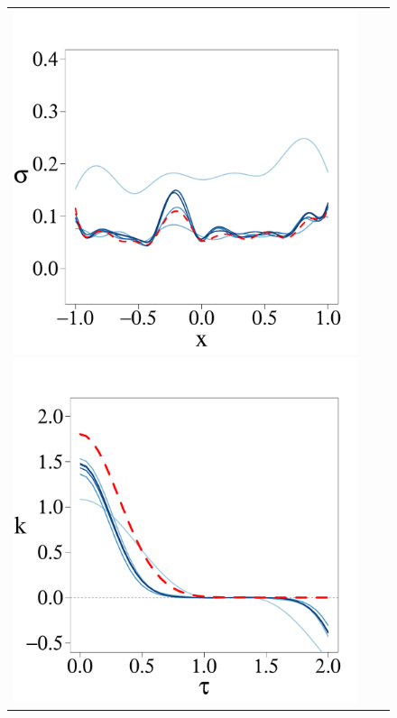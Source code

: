 \documentclass[onecolumn,a4paper,11pt]{article}
\begin{document}
\begin{figure}
\begin{tabular}{ c c c }
\includegraphics[scale=0.215, trim = 0mm 14mm 0mm 14mm, clip]{ch5_fig3_Sigma_part3.pdf} 
\includegraphics[scale=0.215, trim = 0mm 14mm 5mm 14mm, clip]{ch5_fig3_Cov_part3.pdf} &\\

\end{tabular}
\end{figure}
\end{document}
